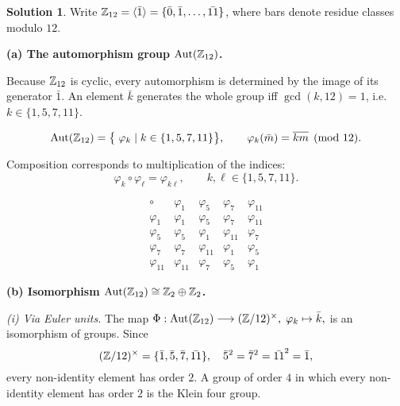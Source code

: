 \documentclass[12pt]{article}
\DeclareMathOperator{\Aut}{Aut}
\theoremstyle{definition} %
\newtheorem{solution}{Solution}
\theoremstyle{plain} %
\begin{document}
              \begin{solution}
                Write $\Bbb Z_{12}=\langle\bar 1\rangle=\{\bar 0,\bar1,\dots,\bar{11}\}$,
                where bars denote residue classes modulo $12$.
                
                \bigskip
                \textbf{(a)  The automorphism group $\Aut(\Bbb Z_{12})$.}
                
                Because $\Bbb Z_{12}$ is cyclic, every automorphism is determined by the
                image of its generator $\bar1$.  
                An element $\bar k$ generates the whole group iff
                $\gcd(k,12)=1$, i.e.\ $k\in\{1,5,7,11\}$.
                
                \[
                \Aut(\Bbb Z_{12})
                   =\bigl\{\;\varphi_{k} \mid k\in\{1,5,7,11\}\bigr\},
                   \qquad
                   \varphi_{k}(\bar m)=\overline{km}\pmod{12}.
                \]
                
                Composition corresponds to multiplication of the indices:
                \[
                   \varphi_{k}\circ\varphi_{\ell}=\varphi_{k\ell},
                   \qquad k,\ell\in\{1,5,7,11\}.
                \]
                
                \[
                \renewcommand{\arraystretch}{1.15}
                \begin{array}{c|cccc}
                \circ & \varphi_{1} & \varphi_{5} & \varphi_{7} & \varphi_{11}\\\hline
                \varphi_{1} & \varphi_{1} & \varphi_{5} & \varphi_{7} & \varphi_{11}\\
                \varphi_{5} & \varphi_{5} & \varphi_{1} & \varphi_{11} & \varphi_{7}\\
                \varphi_{7} & \varphi_{7} & \varphi_{11} & \varphi_{1} & \varphi_{5}\\
                \varphi_{11}& \varphi_{11}& \varphi_{7} & \varphi_{5} & \varphi_{1}
                \end{array}
                \]
                
                \bigskip
                \textbf{(b)  Isomorphism $\Aut(\Bbb Z_{12})\cong\Bbb Z_{2}\oplus\Bbb Z_{2}$.}
                
                \smallskip
                \emph{(i) Via Euler units.}\;
                The map
                \(
                   \Phi:\Aut(\Bbb Z_{12})\longrightarrow (\Bbb Z/12)^{\times},
                   \;
                   \varphi_{k}\mapsto\bar k,
                \)
                is an isomorphism of groups.  
                Since
                \[
                   (\Bbb Z/12)^{\times}=\{\bar1,\bar5,\bar7,\bar{11}\},
                   \quad
                   \bar5^{2}=\bar7^{2}=\bar{11}^{2}=\bar1,
                \]
                every non-identity element has order $2$.  
                A group of order $4$ in which every non-identity element has order $2$
                is the Klein four group.
                

\end{solution}
\end{document}
